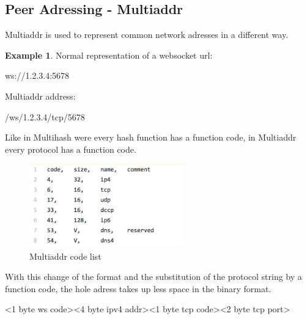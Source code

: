 \documentclass[a4paper,11pt, oneside]{report}
\theoremstyle{definition}
\newtheorem{exmp}{Example}[subsection]
\begin{document}
\subsection{Peer Adressing - Multiaddr}
Multiaddr is used to represent common network adresses in a different way.
\begin{exmp}
Normal representation of a websocket url: 
\begin{center}
ws://1.2.3.4:5678\\
\end{center}
Multiaddr address:
\begin{center}
/ws/1.2.3.4/tcp/5678
\end{center}
\end{exmp}
\noindent
Like in Multihash were every hash function has a function code, in Multiaddr every protocol has a function code. \\
\begin{figure}[H]
\centering
\includegraphics[width=0.6\textwidth]{img/multiaddr.png}
\caption[Multiaddr code list]{Multiaddr code list}
\end{figure}
\noindent
With this change of the format and the substitution of the protocol string by a function code, the hole adress takes up less space in the binary format.
\begin{center}
<1 byte ws code><4 byte ipv4 addr><1 byte tcp code><2 byte tcp port>
\end{center}
\newpage
\end{document}
